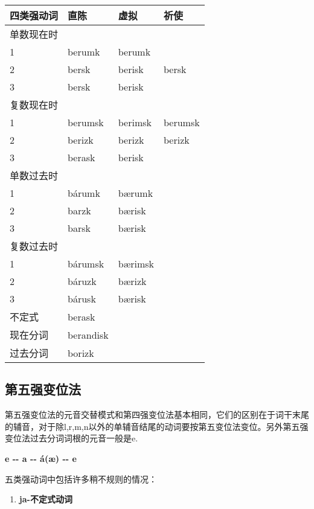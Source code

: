 \begin{longtable}{llll}
  \toprule
  四类强动词 & 直陈        & 虚拟      & 祈使      \\
  \midrule
  \endhead
  \bottomrule
  \endfoot
  单数现在时 &           &         &         \\
  1     & berumk    & berumk  &         \\
  2     & bersk     & berisk  & bersk   \\
  3     & bersk     & berisk  &         \\
  复数现在时 &           &         &         \\
  1     & berumsk   & berimsk & berumsk \\
  2     & berizk    & berizk  & berizk  \\
  3     & berask    & berisk  &         \\
  单数过去时 &           &         &         \\
  1     & bárumk    & bærumk  &         \\
  2     & barzk     & bærisk  &         \\
  3     & barsk     & bærisk  &         \\
  复数过去时 &           &         &         \\
  1     & bárumsk   & bærimsk &         \\
  2     & báruzk    & bærizk  &         \\
  3     & bárusk    & bærisk  &         \\
  不定式   & berask    &         &         \\
  现在分词  & berandisk &         &         \\
  过去分词  & borizk    &         &         \\
\end{longtable}

\subsection{第五强变位法}\label{第五强变位法}

第五强变位法的元音交替模式和第四强变位法基本相同，它们的区别在于词干末尾的辅音，对于除l,r,m,n以外的单辅音结尾的动词要按第五变位法变位。另外第五强变位法过去分词词根的元音一般是e.

\textbf{e -\/- a -\/- á(æ) -\/- e}

五类强动词中包括许多稍不规则的情况：

\begin{enumerate}
  \def\labelenumi{\arabic{enumi})}
  \item
        \textbf{ja-不定式动词}
\end{enumerate}

